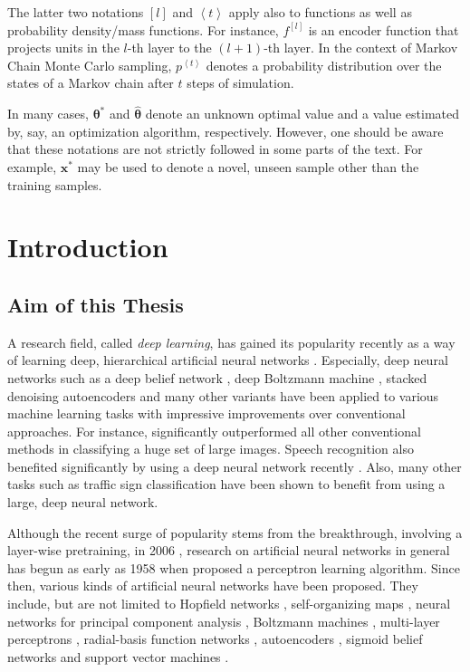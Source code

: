 \documentclass[dissertation,nocontribution,draft*]{aaltoseries}
\newcommand{\qt}[1]{\left<#1\right>}
\newcommand{\qlay}[1]{\left[#1\right]}
\newcommand{\vect}[1]{\mathbf{#1}}
\newcommand{\vects}[1]{\boldsymbol{#1}}
\newcommand{\vx}[0]{\vect{x}}
\newcommand{\TT}[0]{{\vects{\theta}}}
\begin{document}
The latter two notations $\qlay{l}$ and $\qt{t}$ apply also
to functions as well as probability density/mass functions.
For instance, $f^{\qlay{l}}$ is an encoder function that
projects units in the $l$-th layer to the $(l+1)$-th layer.
In the context of Markov Chain Monte Carlo sampling, 
$p^{\qt{t}}$ denotes a probability distribution over the
states of a Markov chain after $t$ steps of simulation.

In many cases, $\TT^*$ and $\hat{\TT}$ denote an unknown
optimal value and a value estimated by, say, an optimization
algorithm, respectively. However, one should be aware that
these notations are not strictly followed in some parts of
the text. For example, $\vx^*$ may be used to denote a
novel, unseen sample other than the training samples.










\chapter{Introduction}


\section{Aim of this Thesis}

A research field, called \textit{deep learning}, has gained
its popularity recently as a way of learning deep,
hierarchical artificial neural networks \citep[see, for
example,][]{Bengio2009a}.  Especially, deep neural networks
such as a deep belief network \citep{Hinton2006nc}, deep
Boltzmann machine \citep{Salakhutdinov2009a}, stacked
denoising autoencoders \citep{Vincent2010} and many other
variants have been applied to various machine learning tasks
with impressive improvements over conventional approaches.
For instance, \citet{Krizhevsky2012} significantly
outperformed all other conventional methods in classifying a
huge set of large images. Speech recognition also benefited
significantly by using a deep neural network recently
\citep{Hinton2012sp}. Also, many other tasks such as traffic
sign classification \citep{Ciresan2012c} have been shown to
benefit from using a large, deep neural network.

Although the recent surge of popularity stems from the
breakthrough, involving a layer-wise pretraining, in 2006
\citep{Hinton2006,Bengio2007nips,Ranzato2007}, research on
artificial neural networks in general has begun as
early as 1958 when \citet{Rosenblatt1958} proposed a
perceptron learning algorithm. Since then, various kinds of
artificial neural networks have been proposed. They include,
but are not limited to Hopfield networks
\citep{Hopfield1982}, self-organizing maps
\citep{Kohonen1982}, neural networks for principal component
analysis \citep{Oja1982}, Boltzmann machines
\citep{Ackley1985}, multi-layer perceptrons
\citep{Rumelhart1986}, radial-basis function networks
\citep{Broomhead1988}, autoencoders \citep{Baldi1989}, sigmoid
belief networks \citep{Neal1992} and support vector machines
\citep{Cortes1995}.
\end{document}
